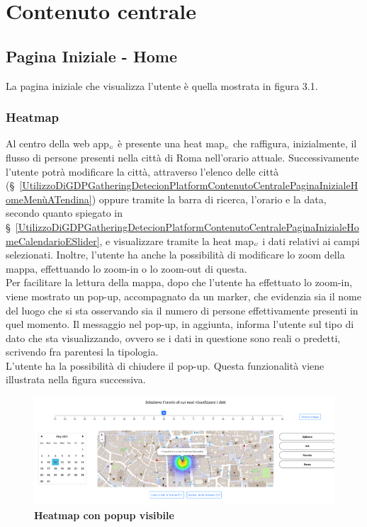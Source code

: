 \section{Contenuto centrale}\label{UtilizzoDiGDPGatheringDetecionPlatformContenutoCentrale}

\subsection{Pagina Iniziale - Home} \label{UtilizzoDiGDPGatheringDetecionPlatformContenutoCentralePaginaInizialeHome}
La pagina iniziale che visualizza l'utente è quella mostrata in figura 3.1.

\subsubsection{Heatmap}\label{UtilizzoDiGDPGatheringDetecionPlatformContenutoCentralePaginaInizialeHomeHeatmap}
Al centro della web app$_{\scaleto{G}{3pt}}$ è presente una heat map$_{\scaleto{G}{3pt}}$ che raffigura, inizialmente, il flusso di persone presenti nella città di Roma nell'orario attuale. Successivamente l'utente potrà modificare la città, attraverso l'elenco delle città (\S~\ref{UtilizzoDiGDPGatheringDetecionPlatformContenutoCentralePaginaInizialeHomeMenùATendina}) oppure tramite la barra di ricerca, l'orario e la data, secondo quanto spiegato in \S~\ref{UtilizzoDiGDPGatheringDetecionPlatformContenutoCentralePaginaInizialeHomeCalendarioESlider}, e visualizzare tramite la heat map$_{\scaleto{G}{3pt}}$ i dati relativi ai campi selezionati. Inoltre, l'utente ha anche la possibilità di modificare lo zoom della mappa, effettuando lo zoom-in o lo zoom-out di questa. \\
Per facilitare la lettura della mappa, dopo che l'utente ha effettuato lo zoom-in, viene mostrato un pop-up, accompagnato da un marker, che evidenzia sia il nome del luogo che si sta osservando sia il numero di persone effettivamente presenti in quel momento. Il messaggio nel pop-up, in aggiunta, informa l'utente sul tipo di dato che sta visualizzando, ovvero se i dati in questione sono reali o predetti, scrivendo fra parentesi la tipologia. \\
L'utente ha la possibilità di chiudere il pop-up. Questa funzionalità viene illustrata nella figura successiva.

\begin{center}
	\begin{figure}[H]
		\centering\includegraphics[width=0.9\linewidth]{../immagini/manualeUtente/heatmapPopup.png}
		\caption{\textbf{\textbf{\textbf{Heatmap con popup visibile}}}}
	\end{figure}
\end{center}

